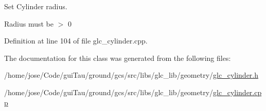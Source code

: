 Set Cylinder radius. 

Radius must be $>$ 0 

Definition at line 104 of file glc\-\_\-cylinder.\-cpp.



The documentation for this class was generated from the following files\-:\begin{DoxyCompactItemize}
\item 
/home/jose/\-Code/gui\-Tau/ground/gcs/src/libs/glc\-\_\-lib/geometry/\hyperlink{glc__cylinder_8h}{glc\-\_\-cylinder.\-h}\item 
/home/jose/\-Code/gui\-Tau/ground/gcs/src/libs/glc\-\_\-lib/geometry/\hyperlink{glc__cylinder_8cpp}{glc\-\_\-cylinder.\-cpp}\end{DoxyCompactItemize}
